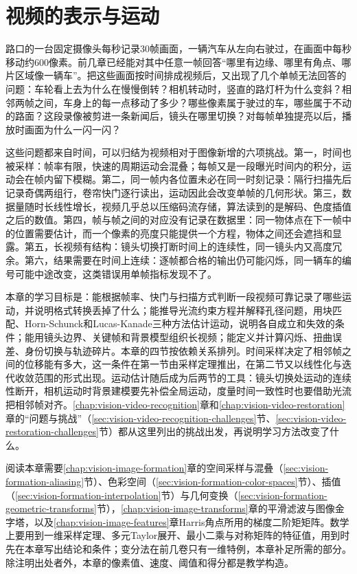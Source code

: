 \chapter{视频的表示与运动}
\label{chap:vision-video-foundations}

路口的一台固定摄像头每秒记录30帧画面，一辆汽车从左向右驶过，在画面中每秒移动约600像素。前几章已经能对其中任意一帧回答“哪里有边缘、哪里有角点、哪片区域像一辆车”。把这些画面按时间排成视频后，又出现了几个单帧无法回答的问题：车轮看上去为什么在慢慢倒转？相机转动时，竖直的路灯杆为什么变斜？相邻两帧之间，车身上的每一点移动了多少？哪些像素属于驶过的车，哪些属于不动的路面？这段录像被剪进一条新闻后，镜头在哪里切换？对每帧单独提亮以后，播放时画面为什么一闪一闪？

这些问题都来自时间，可以归结为视频相对于图像新增的六项挑战。第一，时间也被采样：帧率有限，快速的周期运动会混叠；每帧又是一段曝光时间内的积分，运动会在帧内留下模糊。第二，同一帧内各位置未必在同一时刻记录：隔行扫描先后记录奇偶两组行，卷帘快门逐行读出，运动因此会改变单帧的几何形状。第三，数据量随时长线性增长，视频几乎总以压缩码流存储，算法读到的是解码、色度插值之后的数值。第四，帧与帧之间的对应没有记录在数据里：同一物体点在下一帧中的位置需要估计，而一个像素的亮度只能提供一个方程，物体之间还会遮挡和显露。第五，长视频有结构：镜头切换打断时间上的连续性，同一镜头内又高度冗余。第六，结果需要在时间上连续：逐帧都合格的输出仍可能闪烁，同一辆车的编号可能中途改变，这类错误用单帧指标发现不了。

本章的学习目标是：能根据帧率、快门与扫描方式判断一段视频可靠记录了哪些运动，并说明格式转换丢掉了什么；能推导光流约束方程并解释孔径问题，用块匹配、Horn-Schunck和Lucas-Kanade三种方法估计运动，说明各自成立和失效的条件；能用镜头边界、关键帧和背景模型组织长视频；能定义并计算闪烁、扭曲误差、身份切换与轨迹碎片。本章的四节按依赖关系排列。时间采样决定了相邻帧之间的位移能有多大，这一条件在第一节由采样定理推出，在第二节又以线性化与迭代收敛范围的形式出现。运动估计随后成为后两节的工具：镜头切换处运动的连续性断开，相机运动时背景建模要先补偿全局运动，度量时间一致性时也要借助光流把相邻帧对齐。\ref{chap:vision-video-recognition}章和\ref{chap:vision-video-restoration}章的“问题与挑战”（\ref{sec:vision-video-recognition-challenges}节、\ref{sec:vision-video-restoration-challenges}节）都从这里列出的挑战出发，再说明学习方法改变了什么。

阅读本章需要\ref{chap:vision-image-formation}章的空间采样与混叠（\ref{sec:vision-formation-aliasing}节）、色彩空间（\ref{sec:vision-formation-color-spaces}节）、插值（\ref{sec:vision-formation-interpolation}节）与几何变换（\ref{sec:vision-formation-geometric-transforms}节），\ref{chap:vision-image-transforms}章的平滑滤波与图像金字塔，以及\ref{chap:vision-image-features}章Harris角点所用的梯度二阶矩矩阵。数学上要用到一维采样定理、多元Taylor展开、最小二乘与对称矩阵的特征值，用到时先在本章写出结论和条件；变分法在前几卷只有一维特例，本章补足所需的部分。除注明出处者外，本章的像素值、速度、阈值和得分都是教学构造。

